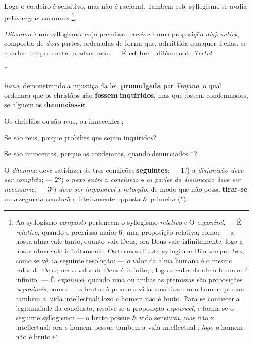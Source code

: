 Logo o cordeiro é sensitivo, mas não é racional. Tambem este syllogismo se avalia pelas regras communs \footnote{Ao syllogismo \emph{composto} pertencem o syllogismo \emph{relativo} e O \emph{exponivel}. --- É \emph{relativo}, quando a premissa maior 6. uma proposição relativa; como: --- a nossa alma vale tanto, quanto vale Deus; ora Deus vale infinitamente: logo a nossa alma vale infinitamente. Os termos d' este syllogismo Bão sempre \emph{tres}, como se vê ua seguinte resolução: --- \emph{o} valor da alma humana é o mesmo valor de Deus; ora o valor de Deus é infinito; ; logo \emph{o} valor da alma humana é infinito. --- É \emph{exponivel}, quando uma ou ambas as premissas são proposições \emph{exponioeis}, como: --- \emph{o} bruto só possue a vida sensitiva; ora o homem possue tambem a. vida intellectual: lozo o homem não é bruto. Para se contiecer a legitimidade da conclusão, resolve-se a proposição \emph{expowicel}, e forma-se o seguinte syllogismo: --- o bruto possue \& vida sensitiva, mas não x intellectual: ora o homem possue tambem a vida intellectual ; \emph{logo} o homem não é bruto.}.


\emph{Dilemma} é um syllogismo; cuja premissa . \emph{maior} é uma proposição \emph{disjunctiva}, composta: de \emph{duas} partes, ordenadas de forma que, admittida qualquer d'ellas. se conclue sempre contra o adversario. --- É celebre o dilémma de \emph{Tertul}-

\textasciicircum{}

\emph{liano}, demonstrando a injustiça da lei, \textbf{promulgada} por \emph{Trajano}, o qual ordenara que os christãos não \textbf{fossem inquiridos}, mas que fossem condemnados, se alguem os \textbf{denunciasse}:

Os chrislãos ou são reus, ou innocenles ;

Se são reus, porque probibes que sejum inquiridos?

Se são innocentes, porque os condemnas, quando denunciados *?

O \emph{dilemma} deve satisfazer ás tres condições \textbf{seguintes}: --- 1?) a \emph{disjuncção deve ser completa}; --- 2º) o \emph{nexo entre} a \emph{conclusão} e \emph{as parles da disiuncção deve ser necessario}; --- 3º) \emph{deve ser impossivel} a \emph{retorção}, de modo que não possa \textbf{tirar-se} uma segunda conclusão, inteiramente opposta \& primeira (").


